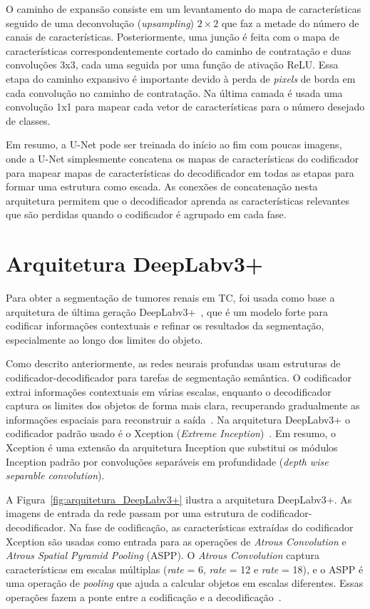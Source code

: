 O caminho de expansão consiste em um levantamento do mapa de características seguido de uma deconvolução (\textit{upsampling}) $2\times2$ que faz a metade do número de canais de características. Posteriormente, uma junção é feita com o mapa de características correspondentemente cortado do caminho de contratação e duas convoluções 3x3, cada uma seguida por uma função de ativação ReLU. Essa etapa do caminho expansivo é importante devido à perda de \textit{pixels} de borda em cada convolução no caminho de contratação. Na última camada é usada uma convolução 1x1 para mapear cada vetor de características para o número desejado de classes.

Em resumo, a U-Net pode ser treinada do início ao fim com poucas imagens, onde a U-Net simplesmente concatena os mapas de características do codificador para mapear mapas de características do decodificador em todas as etapas para formar uma estrutura como escada. As conexões de concatenação nesta arquitetura permitem que o decodificador aprenda as características relevantes que são perdidas quando o codificador é agrupado em cada fase.

\section{Arquitetura DeepLabv3+}
\label{sec:deeplabv3+}

Para obter a segmentação de tumores renais em TC, foi usada como base a arquitetura de última geração DeepLabv3+~\cite{chen2018encoder}, que é um modelo forte para codificar informações contextuais e refinar os resultados da segmentação, especialmente ao longo dos limites do objeto.

Como descrito anteriormente, as redes neurais profundas usam estruturas de codificador-decodificador para tarefas de segmentação semântica. O codificador extrai informações contextuais em várias escalas, enquanto o decodificador captura os limites dos objetos de forma mais clara, recuperando gradualmente as informações espaciais para reconstruir a saída~\cite{chen2018encoder}. Na arquitetura DeepLabv3+ o codificador padrão usado é o Xception (\textit{Extreme Inception})~\cite{chollet2017xception}. Em resumo, o Xception é uma extensão da arquitetura Inception que substitui os módulos Inception padrão por convoluções separáveis em profundidade (\textit{depth wise separable convolution}).

A Figura~\ref{fig:arquitetura_DeepLabv3+} ilustra a arquitetura DeepLabv3+. As imagens de entrada da rede passam por uma estrutura de codificador-decodificador. Na fase de codificação, as características extraídas do codificador Xception são usadas como entrada para as operações de \textit{Atrous Convolution} e \textit{Atrous Spatial Pyramid Pooling} (ASPP). O \textit{Atrous Convolution} captura características em escalas múltiplas (\textit{rate} = 6, \textit{rate} = 12 e \textit{rate} = 18), e o ASPP é uma operação de \textit{pooling} que ajuda a calcular objetos em escalas diferentes. Essas operações fazem a ponte entre a codificação e a decodificação~\cite{chen2018encoder}.

